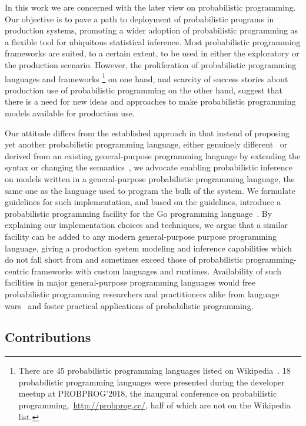 \documentclass[sigplan,review,10pt,anonymous]{acmart}
\begin{document}
\begin{sloppypar}
  In this work we are concerned with the later view on
  probabilistic programming. Our objective is to pave a path
  to deployment of probabilistic programs in production
  systems, promoting a wider adoption of probabilistic
  programming as a flexible tool for ubiquitous statistical
  inference. Most probabilistic programming frameworks are
  suited, to a certain extent, to be used in either the
  exploratory or the production scenario. However, the
  proliferation of probabilistic programming languages and
  frameworks \footnote{There are 45 probabilistic programming
  languages listed on
  Wikipedia~\cite{wiki:Probabilistic_programming_language}. 18
  probabilistic programming languages were presented during
  the developer meetup at PROBPROG'2018, the inaugural
  conference on probabilistic
  programming,~\url{http://probprog.cc/}, half of which are
  not on the Wikipedia list.} on one hand, and scarcity of success
  stories about production use of probabilistic programming on
  the other hand, suggest that there is a need for new ideas
  and approaches to make probabilistic programming models
  available for production use.

  Our attitude differs from the established approach in that
  instead of proposing yet another probabilistic programming
  language, either genuinely different~\cite{MMR+07,Stan17} or
  derived from an existing general-purpose programming
  language by extending the syntax or changing the
  semantics~\cite{GMR+08,TMY+16,GXG18}, we advocate enabling
  probabilistic inference on models written in a
  general-purpose probabilistic programming language, the same
  one as the language used to program the bulk of the system. 
  We formulate guidelines for such implementation, and based
  on the guidelines, introduce a probabilistic programming
  facility for the Go programming language~\cite{Golang}. By
  explaining our implementation choices and techniques,
  we argue that a similar facility can be added to any modern
  general-purpose purpose programming language, giving a
  production system modeling and inference capabilities which
  do not fall short from and sometimes exceed those of
  probabilistic programming-centric frameworks with custom
  languages and runtimes. Availability of such facilities
  in major general-purpose programming languages would free
  probabilistic programming researchers and practitioners
  alike from language wars~\cite{SH14} and foster practical
  applications of probabilistic programming.

  \subsection*{Contributions}


\end{sloppypar}
\end{document}
